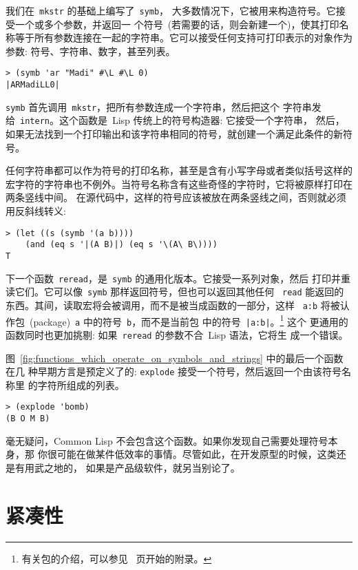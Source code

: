 我们在~\verb|mkstr| 的基础上编写了~\verb|symb|，
大多数情况下，它被用来构造符号。它接受一个或多个参数，并返回一
个符号~(若需要的话，则会新建一个)，使其打印名称等于所有参数连接在一起的字符串。它可以接受任何支持可打印表示的对象作为参数: 符号、字符串、数字，甚至列表。
\begin{lstlisting}
> (symb 'ar "Madi" #\L #\L 0)
|ARMadiLL0|
\end{lstlisting}
\texttt{symb} 首先调用~\texttt{mkstr}，把所有参数连成一个字符串，然后把这个
字符串发给~\texttt{intern}。这个函数是~Lisp 传统上的符号构造器: 它接受一个字符串，
然后，如果无法找到一个打印输出和该字符串相同的符号，就创建一个满足此条件的新符号。

任何字符串都可以作为符号的打印名称，甚至是含有小写字母或者类似括号这样的
宏字符的字符串也不例外。当符号名称含有这些奇怪的字符时，它将被原样打印在两条竖线中间。
在源代码中，这样的符号应该被放在两条竖线之间，否则就必须用反斜线转义:
\begin{lstlisting}
> (let ((s (symb '(a b))))
    (and (eq s '|(A B)|) (eq s '\(A\ B\))))
T
\end{lstlisting}

下一个函数~\texttt{reread}，是~\texttt{symb} 的通用化版本。它接受一系列对象，然后
打印并重读它们。它可以像~\texttt{symb} 那样返回符号，但也可以返回其他任何
~\texttt{read} 能返回的东西。其间，读取宏将会被调用，而不是被当成函数的一部分，这样~
\texttt{a:b} 将被认作包~(package)~\texttt{a} 中的符号~\texttt{b}，而不是当前包
中的符号~\texttt{|a:b|}。\footnote{有关包的介绍，可以参见~\pageref{chap:packages}
  页开始的附录。} 这个
更通用的函数同时也更加挑剔: 如果~\texttt{reread} 的参数不合~Lisp 语法，它将生
成一个错误。

图~\ref{fig:functions_which_operate_on_symbols_and_strings} 中的最后一个函数在几
种早期方言是预定义了的: \texttt{explode} 接受一个符号，然后返回一个由该符号名称里
的字符所组成的列表。
\begin{lstlisting}
> (explode 'bomb)
(B O M B)
\end{lstlisting}

毫无疑问，Common Lisp 不会包含这个函数。如果你发现自己需要处理符号本身，那
你很可能在做某件低效率的事情。尽管如此，在开发原型的时候，这类\utility{}还是有用武之地的，
如果是产品级软件，就另当别论了。

\section{紧凑性}
\label{sec:density}

